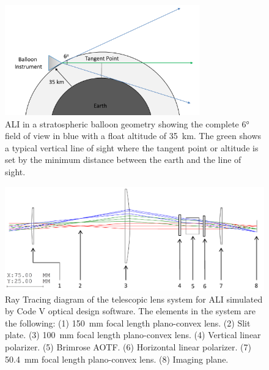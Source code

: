 \documentclass[12pt]{article}
\begin{document}
\clearpage

\begin{figure}
        \centering
        \includegraphics[width=0.75\textwidth]{./Images/5-4-BalloonGeometry.pdf}
        \caption{ALI in a stratospheric balloon geometry showing the complete 6\si{\degree} field of view in blue with a float altitude of 35~km. The green shows a typical vertical line of sight where the tangent point or altitude is set by the minimum distance between the earth and the line of sight.  }
        \label{fig:5.4:balloonGeometry}
\end{figure}

\clearpage

\begin{figure}
    \includegraphics[width=1.0\textwidth]{./Images/3-2-TelescopicRayTracing.pdf}
    \caption{Ray Tracing diagram of the telescopic lens system for ALI simulated by Code V optical design software. The elements in the system are the following: (1) 150~mm
focal length plano-convex lens. (2) Slit plate. (3) 100~mm focal length plano-convex lens. (4) Vertical linear polarizer. (5) Brimrose AOTF. (6) Horizontal linear polarizer.
(7) 50.4~mm focal length plano-convex lens. (8) Imaging plane.}
    \label{fig:3.2:telescopicRayTracing}
\end{figure}

\clearpage
\end{document}
